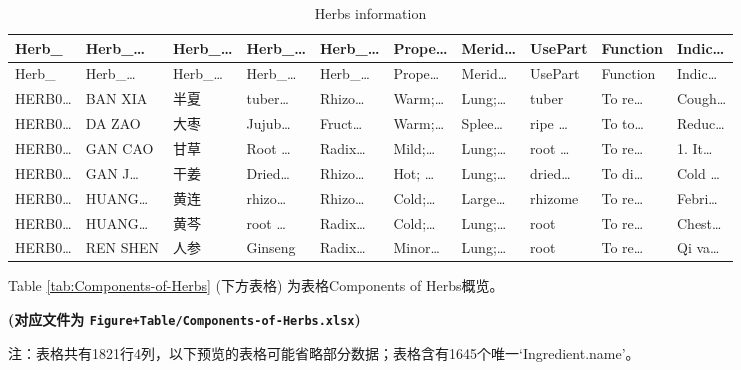 \documentclass[
]{article}
\begin{document}
\begin{longtable}[]{@{}llllllllll@{}}
\caption{\label{tab:Herbs-information}Herbs information}\tabularnewline
\toprule
Herb\_ & Herb\_\ldots{} & Herb\_\ldots{} & Herb\_\ldots{} & Herb\_\ldots{} & Prope\ldots{} & Merid\ldots{} & UsePart & Function & Indic\ldots{}\tabularnewline
\midrule
\endfirsthead
\toprule
Herb\_ & Herb\_\ldots{} & Herb\_\ldots{} & Herb\_\ldots{} & Herb\_\ldots{} & Prope\ldots{} & Merid\ldots{} & UsePart & Function & Indic\ldots{}\tabularnewline
\midrule
\endhead
HERB0\ldots{} & BAN XIA & 半夏 & tuber\ldots{} & Rhizo\ldots{} & Warm;\ldots{} & Lung;\ldots{} & tuber & To re\ldots{} & Cough\ldots{}\tabularnewline
HERB0\ldots{} & DA ZAO & 大枣 & Jujub\ldots{} & Fruct\ldots{} & Warm;\ldots{} & Splee\ldots{} & ripe \ldots{} & To to\ldots{} & Reduc\ldots{}\tabularnewline
HERB0\ldots{} & GAN CAO & 甘草 & Root \ldots{} & Radix\ldots{} & Mild;\ldots{} & Lung;\ldots{} & root \ldots{} & To re\ldots{} & 1. It\ldots{}\tabularnewline
HERB0\ldots{} & GAN J\ldots{} & 干姜 & Dried\ldots{} & Rhizo\ldots{} & Hot; \ldots{} & Lung;\ldots{} & dried\ldots{} & To di\ldots{} & Cold \ldots{}\tabularnewline
HERB0\ldots{} & HUANG\ldots{} & 黄连 & rhizo\ldots{} & Rhizo\ldots{} & Cold;\ldots{} & Large\ldots{} & rhizome & To re\ldots{} & Febri\ldots{}\tabularnewline
HERB0\ldots{} & HUANG\ldots{} & 黄芩 & root \ldots{} & Radix\ldots{} & Cold;\ldots{} & Lung;\ldots{} & root & To re\ldots{} & Chest\ldots{}\tabularnewline
HERB0\ldots{} & REN SHEN & 人参 & Ginseng & Radix\ldots{} & Minor\ldots{} & Lung;\ldots{} & root & To re\ldots{} & Qi va\ldots{}\tabularnewline
\bottomrule
\end{longtable}

Table \ref{tab:Components-of-Herbs} (下方表格) 为表格Components of Herbs概览。

\textbf{(对应文件为 \texttt{Figure+Table/Components-of-Herbs.xlsx})}

\begin{center}\begin{tcolorbox}[colback=gray!10, colframe=gray!50, width=0.9\linewidth, arc=1mm, boxrule=0.5pt]注：表格共有1821行4列，以下预览的表格可能省略部分数据；表格含有1645个唯一`Ingredient.name'。
\end{tcolorbox}
\end{center}
\end{document}
